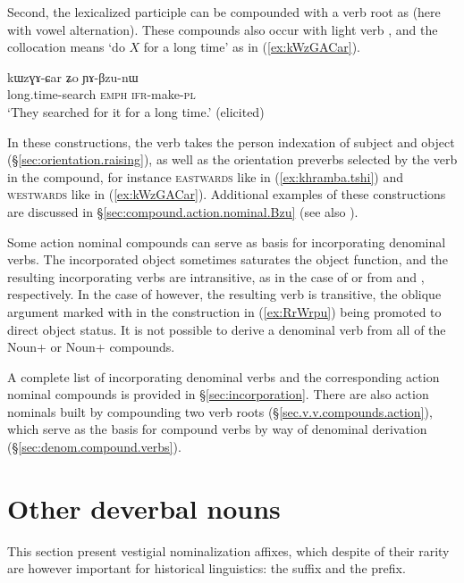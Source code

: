 Second, the lexicalized participle  can be compounded with a verb root as  (here with vowel alternation). These compounds also occur with light verb , and the collocation means `do $X$ for a long time' as in (\ref{ex:kWzGACar}).

\begin{exe}
\ex \label{ex:kWzGACar}
\gll kɯzɣɤ-ɕar ʑo ɲɤ-βzu-nɯ \\
long.time-search \textsc{emph} \textsc{ifr}-make-\textsc{pl} \\
\glt `They searched for it for a long time.' (elicited)
\end{exe}

In these constructions, the verb  takes the person indexation of subject and object (§\ref{sec:orientation.raising}), as well as the orientation preverbs selected by the verb in the compound, for instance \textsc{eastwards} like  in (\ref{ex:khramba.tshi}) and \textsc{westwards} like  in (\ref{ex:kWzGACar}).  Additional examples of these constructions are discussed in §\ref{sec:compound.action.nominal.Bzu} (see also \citealt[252]{jacques16complementation}).
 
Some action nominal compounds can serve as basis for incorporating denominal verbs. The incorporated object sometimes saturates the object function, and the resulting incorporating verbs are intransitive, as in the case of  or  from   and , respectively. In the case of  however, the resulting verb  is transitive, the oblique argument marked with  in the construction in (\ref{ex:RrWrpu}) being promoted to direct object status.  It is not possible to derive a denominal verb from all of the Noun+ or Noun+ compounds.
 
A complete list of incorporating denominal verbs and the corresponding action nominal compounds is provided in §\ref{sec:incorporation}. There are also action nominals built by compounding two verb roots (§\ref{sec.v.v.compounds.action}), which serve as the basis for compound verbs by way of denominal derivation (§\ref{sec:denom.compound.verbs}).

\section{Other deverbal nouns} \label{sec:fossil.nmlz}
This section present vestigial nominalization affixes, which despite of their rarity are however important for historical linguistics: the  suffix and the  prefix.

